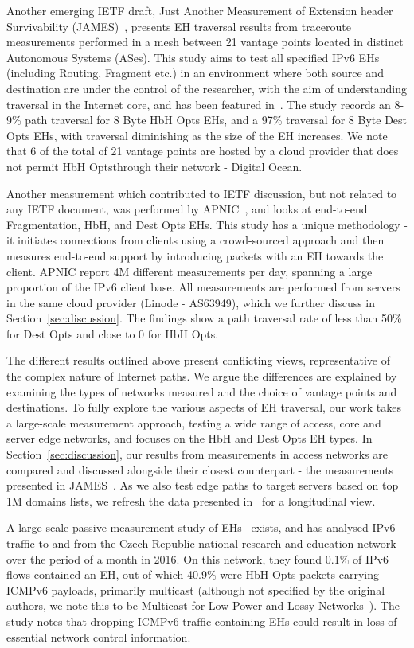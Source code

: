 \documentclass[conference]{IEEEtran}
\begin{document}
Another emerging IETF draft, Just Another Measurement of Extension header Survivability (JAMES)~\cite{james}, presents EH traversal results from traceroute measurements performed in a mesh between 21 vantage points located in distinct Autonomous Systems (ASes). This study aims to test all specified IPv6 EHs (including Routing, Fragment etc.) in an environment where both source and destination are under the control of the researcher, with the aim of understanding traversal in the Internet core, and has been featured in~\cite{james-imc}. The study records an 8-9\% path traversal for 8 Byte HbH Opts EHs, and a 97\% traversal for 8 Byte Dest Opts EHs, with traversal diminishing as the size of the EH increases. We note that 6 of the total of 21 vantage points are hosted by a cloud provider that does not permit HbH Optsthrough their network - Digital Ocean.

Another measurement which contributed to IETF discussion, but not related to any IETF document, was performed by APNIC~\cite{apnic}, and looks at end-to-end Fragmentation, HbH, and Dest Opts EHs. This study has a unique methodology - it initiates connections from clients using a crowd-sourced approach and then measures end-to-end support by introducing packets with an EH towards the client. APNIC report 4M different measurements per day, spanning a large proportion of the IPv6 client base. All measurements are performed from servers in the same cloud provider (Linode - AS63949), which we further discuss in Section~\ref{sec:discussion}. The findings show a path traversal rate of less than 50\% for Dest Opts and close to 0 for HbH Opts.

The different results outlined above present conflicting views, representative of the complex nature of Internet paths. We argue the differences are explained by examining the types of networks measured and the choice of vantage points and destinations. To fully explore the various aspects of EH traversal, our work takes a large-scale measurement approach, testing a wide range of access, core and server edge networks, and focuses on the HbH and Dest Opts EH types. In Section~\ref{sec:discussion}, our results from measurements in access networks are compared and discussed alongside their closest counterpart - the measurements presented in JAMES~\cite{james}. As we also test edge paths to target servers based on top 1M domains lists, we refresh the data presented in~\cite{RFC7872} for a longitudinal view.

 A large-scale passive measurement study of EHs~\cite{passive-threats} exists, and has analysed IPv6 traffic to and from the Czech Republic national research and education network over the period of a month in 2016. On this network, they found 0.1\% of IPv6 flows contained an EH, out of which 40.9\% were HbH Opts packets carrying ICMPv6 payloads, primarily multicast (although not specified by the original authors, we note this to be Multicast for Low-Power and Lossy Networks~\cite{RFC7731}). The study notes that dropping ICMPv6 traffic containing EHs could result in loss of essential network control information. 
\end{document}
